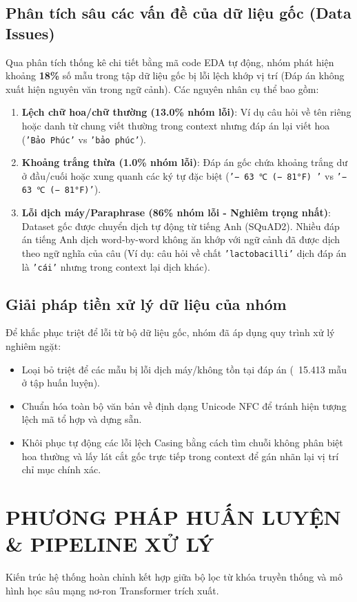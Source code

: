 \documentclass[12pt, a4paper]{article}
\begin{document}
\subsection{Phân tích sâu các vấn đề của dữ liệu gốc (Data Issues)}
Qua phân tích thống kê chi tiết bằng mã code EDA tự động, nhóm phát hiện khoảng \textbf{18\%} số mẫu trong tập dữ liệu gốc bị lỗi lệch khớp vị trí (Đáp án không xuất hiện nguyên văn trong ngữ cảnh). Các nguyên nhân cụ thể bao gồm:
\begin{enumerate}
    \item \textbf{Lệch chữ hoa/chữ thường (13.0\% nhóm lỗi)}: Ví dụ câu hỏi về tên riêng hoặc danh từ chung viết thường trong context nhưng đáp án lại viết hoa (\texttt{'Bảo Phúc'} vs \texttt{'bảo phúc'}).
    \item \textbf{Khoảng trắng thừa (1.0\% nhóm lỗi)}: Đáp án gốc chứa khoảng trắng dư ở đầu/cuối hoặc xung quanh các ký tự đặc biệt (\texttt{'− 63 ℃ (− 81°F) '} vs \texttt{'− 63 ℃ (− 81°F)'}).
    \item \textbf{Lỗi dịch máy/Paraphrase (86\% nhóm lỗi - Nghiêm trọng nhất)}: Dataset gốc được chuyển dịch tự động từ tiếng Anh (SQuAD2). Nhiều đáp án tiếng Anh dịch word-by-word không ăn khớp với ngữ cảnh đã được dịch theo ngữ nghĩa của câu (Ví dụ: câu hỏi về chất \texttt{'lactobacilli'} dịch đáp án là \texttt{'cái'} nhưng trong context lại dịch khác).
\end{enumerate}

\subsection{Giải pháp tiền xử lý dữ liệu của nhóm}
Để khắc phục triệt để lỗi từ bộ dữ liệu gốc, nhóm đã áp dụng quy trình xử lý nghiêm ngặt:
\begin{itemize}
    \item Loại bỏ triệt để các mẫu bị lỗi dịch máy/không tồn tại đáp án (~15.413 mẫu ở tập huấn luyện).
    \item Chuẩn hóa toàn bộ văn bản về định dạng Unicode NFC để tránh hiện tượng lệch mã tổ hợp và dựng sẵn.
    \item Khôi phục tự động các lỗi lệch Casing bằng cách tìm chuỗi không phân biệt hoa thường và lấy lát cắt gốc trực tiếp trong context để gán nhãn lại vị trí chỉ mục chính xác.
\end{itemize}

\section{PHƯƠNG PHÁP HUẤN LUYỆN \& PIPELINE XỬ LÝ}
Kiến trúc hệ thống hoàn chỉnh kết hợp giữa bộ lọc từ khóa truyền thống và mô hình học sâu mạng nơ-ron Transformer trích xuất.
\end{document}
